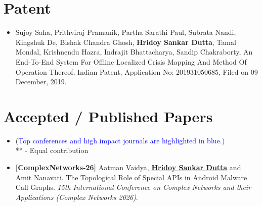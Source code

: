 \documentclass[margin, centered,lmodern]{res}
\begin{document}
\begin{resume}
\section{Patent}
\begin{itemize}[leftmargin=*]

\item Sujoy Saha,  Prithviraj Pramanik,  Partha Sarathi Paul,  Subrata Nandi,  Kingshuk De,  Bishak Chandra Ghosh,  \textbf{Hridoy Sankar Dutta},  Tamal Mondal,  Krishnendu Hazra,  Indrajit Bhattacharya,  Sandip Chakraborty,  An End-To-End System For Offline Localized Crisis Mapping And Method Of Operation Thereof, Indian Patent,  Application No: 201931050685,  Filed on 09 December, 2019.

\end{itemize}


\section{Accepted / Published Papers}
\begin{itemize}[leftmargin=*]
\item[] (\textcolor{blue}{Top conferences and high impact journals are highlighted in blue.}) \\ ** - Equal contribution
\item \textbf{[ComplexNetworks-26]} Aatman Vaidya, \textbf{\underline{Hridoy Sankar Dutta}} and Amit Nanavati.  The Topological Role of Special APIs in Android Malware Call Graphs. \textit{15th International Conference on Complex Networks and their Applications (Complex Networks 2026)}.


\end{itemize}
\end{resume}
\end{document}
